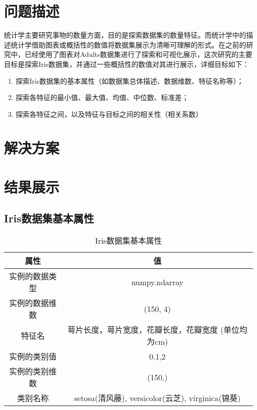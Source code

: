 \documentclass[12pt,a4paper]{article}
\theoremstyle{definition}
\begin{document}
\noindent
\noindent{}
\vspace{-1.5\baselineskip}

\section{问题描述}

统计学主要研究事物的数量方面，目的是探索数据集的数量特征。而统计学中的描述统计学借助图表或概括性的数值将数据集展示为清晰可理解的形式。在之前的研究中，已经使用了图表对Adults数据集进行了探索和可视化展示，这次研究的主要目标是探索Iris数据集，并通过一些概括性的数值对其进行展示，详细目标如下：

\begin{enumerate}
	\item 探索Iris数据集的基本属性（如数据集总体描述、数据维数、特征名称等）；
	
	\item 探索各特征的最小值、最大值、均值、中位数、标准差；
	
	\item 探索各特征之间，以及特征与目标之间的相关性（相关系数）
\end{enumerate}

\section{解决方案}



\section{结果展示}

\subsection{Iris数据集基本属性}

\begin{table}[htbp]
	\renewcommand\arraystretch{1.35}
	\caption{Iris数据集基本属性}
	\label{tab:iris_basic}
	\centering
	
	\begin{tabular}{c|c}
		\centering
		属性 & 值 \\
		\hline
		实例的数据类型 & numpy.ndarray \\
		实例的数据维数 & (150, 4) \\
		特征名 & 萼片长度，萼片宽度，花瓣长度，花瓣宽度 (单位均为cm) \\
		实例的类别值 & 0,1,2 \\
		实例的类别维数 & (150,) \\
		类别名称 & setosa(清风藤), versicolor(云芝), virginica(锦葵) \\
	\end{tabular}
\end{table}
\end{document}
